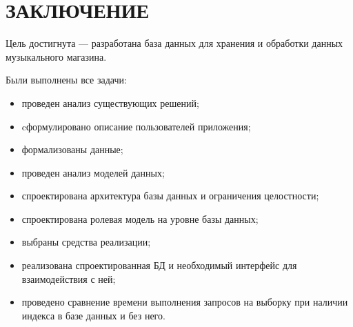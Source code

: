 \chapter*{ЗАКЛЮЧЕНИЕ}

Цель достигнута --- разработана база данных для хранения и обработки данных музыкального магазина.

Были выполнены все задачи:
\begin{itemize}
	\item проведен анализ существующих решений;
	\item cформулировано описание пользователей приложения;
	\item формализованы данные;
	\item проведен анализ моделей данных;
	\item спроектирована архитектура базы данных и ограничения целостности;
	\item спроектирована ролевая модель на уровне базы данных;
	\item выбраны средства реализации;
	\item реализована спроектированная БД и необходимый интерфейс для взаимодействия с ней;
	\item проведено сравнение времени выполнения запросов на выборку при наличии индекса в базе данных и без него.
\end{itemize}